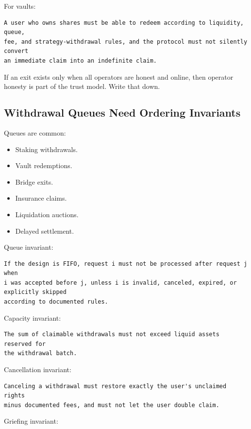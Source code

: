 For vaults:

\begin{lstlisting}
A user who owns shares must be able to redeem according to liquidity, queue,
fee, and strategy-withdrawal rules, and the protocol must not silently convert
an immediate claim into an indefinite claim.
\end{lstlisting}

If an exit exists only when all operators are honest and online, then
operator honesty is part of the trust model. Write that down.

\subsection{Withdrawal Queues Need Ordering Invariants}

Queues are common:

\begin{itemize}
\tightlist
\item
  Staking withdrawals.
\item
  Vault redemptions.
\item
  Bridge exits.
\item
  Insurance claims.
\item
  Liquidation auctions.
\item
  Delayed settlement.
\end{itemize}

Queue invariant:

\begin{lstlisting}
If the design is FIFO, request i must not be processed after request j when
i was accepted before j, unless i is invalid, canceled, expired, or explicitly skipped
according to documented rules.
\end{lstlisting}

Capacity invariant:

\begin{lstlisting}
The sum of claimable withdrawals must not exceed liquid assets reserved for
the withdrawal batch.
\end{lstlisting}

Cancellation invariant:

\begin{lstlisting}
Canceling a withdrawal must restore exactly the user's unclaimed rights
minus documented fees, and must not let the user double claim.
\end{lstlisting}

Griefing invariant:

